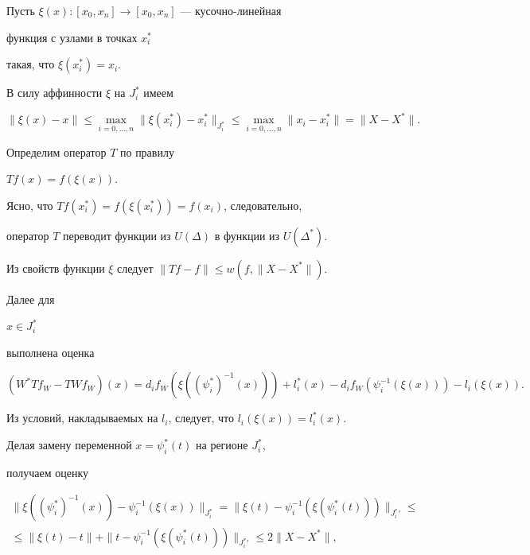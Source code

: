 \begin{pf}


Пусть $\xi (x): [x_0,x_n] \to [x_0,x_n] $ --- кусочно-линейная


функция с узлами в точках $x_i^*$


такая, что $ \xi (x_i^*) = x_i $.


В силу аффинности $ \xi $ на $J_i^*$ имеем


$$


\| \xi (x) - x \| \le \max_{i=0,\dotsc,n}


\|\xi(x_{i}^*)- x_i^*\|_{J_i^*} \le


\max_{i=0,\dotsc,n} \|x_i-x_i^*\| = \|X-X^*\|.


$$


Определим оператор $ T$ по правилу


$ T f (x) = f (\xi (x)) $.


Ясно, что $ T f(x_i^*) = f (\xi(x_i^*))= f (x_i)$, следовательно,


оператор $T$ переводит функции из $U(\Delta)$ в функции из $U(\Delta^*)$.


Из свойств функции $\xi$ следует $ \|T f - f \| \le w(f, \|X-X^*\|) $.


Далее для


$ x \in J_i^* $


выполнена оценка


$$


(W^* T f_W - T W f_W)(x) =


d_i f_W \left(\xi\left((\psi_i^*)^{-1}(x)\right)\right)


+ l_i^* (x) - d_i f_W \left(\psi_i^{-1}(\xi(x))\right) - l_i(\xi(x)).


$$


Из условий, накладываемых на $l_i$, следует, что $l_i(\xi(x))=l_i^*(x)$.


Делая замену переменной $ x = \psi_i^*(t)$ на регионе $J_i^*$,


получаем оценку


\begin{multline*}


\| \xi\left((\psi_i^*)^{-1}(x)\right) - \psi_i^{-1}(\xi(x))\|_{J_i^*} =


\| \xi(t) - \psi_i^{-1}(\xi(\psi_i^*(t))) \|_{{J_i^*}'} \le \\


%


\le \|\xi(t)-t\| + \|t - \psi_i^{-1}(\xi(\psi_i^*(t))) \|_{{J_i^*}'}


\le 2 \|X-X^*\|,



\end{multline*}
\end{pf}
